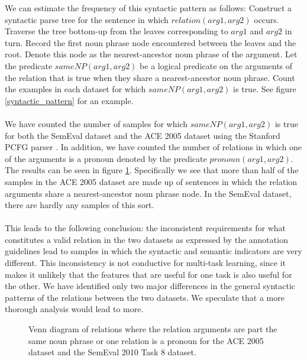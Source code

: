 We can estimate the frequency of this syntactic pattern as follows: Construct a syntactic parse tree for the sentence in which $relation(arg1,arg2)$ occurs. Traverse the tree bottom-up from the leaves corresponding to $arg1$ and $arg2$ in turn. Record the first noun phrase node encountered between the leaves and the root. Denote this node as the nearest-ancestor noun phrase of the argument. Let the predicate $sameNP(arg1, arg2)$ be a logical predicate on the arguments of the relation that is true when they share a nearest-ancestor noun phrase. Count the examples in each dataset for which $sameNP(arg1, arg2)$ is true. See figure \ref{syntactic_pattern} for an example.
\\\\
We have counted the number of samples for which $sameNP(arg1,arg2)$ is true for both the SemEval dataset and the ACE 2005 dataset using the Stanford PCFG parser \citep{klein2003}. In addition, we have counted the number of relations in which one of the arguments is a pronoun denoted by the predicate $pronoun(arg1,arg2)$. The results can be seen in figure \ref{same_noun_phrase}. Specifically we see that more than half of the samples in the ACE 2005 dataset are made up of sentences in which the relation arguments share a nearest-ancestor noun phrase node. In the SemEval dataset, there are hardly any samples of this sort.
\\\\
This leads to the following conclusion: the inconsistent requirements for what constitutes a valid relation in the two datasets as expressed by the annotation guidelines lead to samples in which the syntactic and semantic indicators are very different. This inconsistency is not conductive for multi-task learning, since it makes it unlikely that the features that are useful for one task is also useful for the other. We have identified only two major differences in the general syntactic patterns of the relations between the two datasets. We speculate that a more thorough analysis would lead to more.
\newpage
\begin{figure}[h!]
	\centering
	
	
	\vspace{1cm}
	
	
	\caption{Venn diagram of relations where the relation arguments are part the same noun phrase or one relation is a pronoun for the ACE 2005 dataset and the SemEval 2010 Task 8 dataset.}
	\label{same_noun_phrase}
\end{figure}

